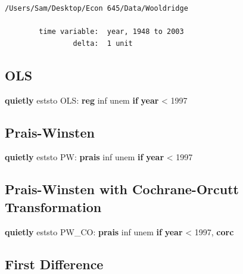 \documentclass[
]{book}
\newenvironment{Shaded}{\begin{snugshade}}{\end{snugshade}}
\newcommand{\FunctionTok}[1]{\textcolor[rgb]{0.13,0.29,0.53}{\textbf{#1}}}
\newcommand{\KeywordTok}[1]{\textcolor[rgb]{0.13,0.29,0.53}{\textbf{#1}}}
\newcommand{\NormalTok}[1]{#1}
\begin{document}
\begin{verbatim}
/Users/Sam/Desktop/Econ 645/Data/Wooldridge

        time variable:  year, 1948 to 2003
                delta:  1 unit
\end{verbatim}

\subsection*{OLS}\label{ols-1}

\begin{Shaded}
\begin{Highlighting}[]
\KeywordTok{quietly}\NormalTok{ eststo OLS: }\KeywordTok{reg}\NormalTok{ inf unem }\KeywordTok{if} \FunctionTok{year}\NormalTok{ \textless{} 1997}
\end{Highlighting}
\end{Shaded}

\subsection*{Prais-Winsten}\label{prais-winsten-1}

\begin{Shaded}
\begin{Highlighting}[]
\KeywordTok{quietly}\NormalTok{ eststo PW: }\KeywordTok{prais}\NormalTok{ inf unem }\KeywordTok{if} \FunctionTok{year}\NormalTok{ \textless{} 1997}
\end{Highlighting}
\end{Shaded}

\subsection*{Prais-Winsten with Cochrane-Orcutt Transformation}\label{prais-winsten-with-cochrane-orcutt-transformation}

\begin{Shaded}
\begin{Highlighting}[]
\KeywordTok{quietly}\NormalTok{ eststo PW\_CO: }\KeywordTok{prais}\NormalTok{ inf unem }\KeywordTok{if} \FunctionTok{year}\NormalTok{ \textless{} 1997, }\KeywordTok{corc}
\end{Highlighting}
\end{Shaded}

\subsection*{First Difference}\label{first-difference-1}
\end{document}
